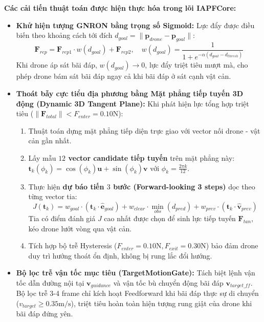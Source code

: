 \documentclass[12pt,a4paper]{article}
\begin{document}
\noindent
\textbf{Các cải tiến thuật toán được hiện thực hóa trong lõi IAPFCore:}
\begin{itemize}[noitemsep,topsep=2pt]
    \item \textbf{Khử hiện tượng GNRON bằng trọng số Sigmoid:}
    Lực đẩy được điều biến theo khoảng cách tới đích $d_{goal} = \|\mathbf{p}_{drone} - \mathbf{p}_{goal}\|$:
    \begin{equation}
        \mathbf{F}_{rep} = \mathbf{F}_{rep1} \cdot w(d_{goal}) + \mathbf{F}_{rep2}, \quad w(d_{goal}) = \frac{1}{1 + e^{-\alpha (d_{goal} - d_{thresh})}}
    \end{equation}
    Khi drone áp sát bãi đáp, $w(d_{goal}) \to 0$, lực đẩy triệt tiêu mượt mà, cho phép drone bám sát bãi đáp ngay cả khi bãi đáp ở sát cạnh vật cản.
    
    \item \textbf{Thoát bẫy cực tiểu địa phương bằng Mặt phẳng tiếp tuyến 3D động (Dynamic 3D Tangent Plane):}
    Khi phát hiện lực tổng hợp triệt tiêu ($\|\mathbf{F}_{total}\| < F_{enter} = 0.10\text{N}$):
    \begin{enumerate}[noitemsep]
        \item Thuật toán dựng mặt phẳng tiếp diện trực giao với vector nối drone - vật cản gần nhất.
        \item Lấy mẫu \textbf{$12$ vector candidate tiếp tuyến} trên mặt phẳng này: $\mathbf{t}_k (\phi_k) = \cos(\phi_k)\mathbf{u} + \sin(\phi_k)\mathbf{v}$ với $\phi_k = \frac{2\pi k}{12}$.
        \item Thực hiện \textbf{dự báo tiến $3$ bước (Forward-looking 3 steps)} dọc theo từng vector tia:
        \begin{equation}
            J(\mathbf{t}_k) = w_{goal} \cdot (\mathbf{t}_k \cdot \hat{\mathbf{e}}_{goal}) + w_{clear} \cdot \min_{obs}(d_{pred}) + w_{prev} \cdot (\mathbf{t}_k \cdot \hat{\mathbf{v}}_{prev})
        \end{equation}
        Tia có điểm đánh giá $J$ cao nhất được chọn để sinh lực tiếp tuyến $\mathbf{F}_{tan}$, kéo drone lướt vòng qua vật cản.
        \item Tích hợp bộ trễ Hysteresis ($F_{enter} = 0.10\text{N}, F_{exit} = 0.30\text{N}$) bảo đảm drone duy trì hướng thoát ổn định, không bị rung lắc đổi hướng.
    \end{enumerate}

    \item \textbf{Bộ lọc trễ vận tốc mục tiêu (TargetMotionGate):}
    Tách biệt lệnh vận tốc dẫn đường nội tại $\mathbf{v}_{guidance}$ và vận tốc bù chuyển động bãi đáp $\mathbf{v}_{target\_ff}$. Bộ lọc trễ 3-4 frame chỉ kích hoạt Feedforward khi bãi đáp thực sự di chuyển ($v_{target} \ge 0.35\text{m/s}$), triệt tiêu hoàn toàn hiện tượng rung giật của drone khi bãi đáp đứng yên.
\end{itemize}
\end{document}
